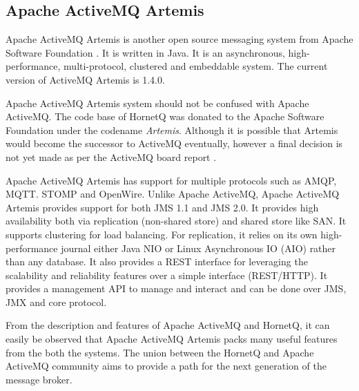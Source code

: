 \subsection{Apache ActiveMQ Artemis}

Apache ActiveMQ Artemis is another open source messaging system from Apache Software Foundation \parencite{artemis_home}. It is written in Java. It is an asynchronous, high-performance, multi-protocol, clustered and embeddable system. The current version of ActiveMQ Artemis is 1.4.0.

Apache ActiveMQ Artemis system should not be confused with Apache ActiveMQ. The code base of HornetQ was donated to the Apache Software Foundation under the codename \textit{Artemis}. Although it is possible that Artemis would become the successor to ActiveMQ eventually, however a final decision is not yet made as per the ActiveMQ board report \parencite{artemis_vs_activemq}.

Apache ActiveMQ Artemis has support for multiple protocols such as AMQP, MQTT. STOMP and OpenWire. Unlike Apache ActiveMQ, Apache ActiveMQ Artemis provides support for both JMS 1.1 and JMS 2.0. It provides high availability both via replication (non-shared store) and shared store like SAN. It supports clustering for load balancing. For replication, it relies on its own high-performance journal either Java NIO or Linux Asynchronous IO (AIO) rather than any database. It also provides a REST interface for leveraging the scalability and reliability features over a simple interface (REST/HTTP). It provides a management API to manage and interact and can be done over JMS, JMX and core protocol.

From the description and features of Apache ActiveMQ and HornetQ, it can easily be observed that Apache ActiveMQ Artemis packs many useful features from the both the systems. The union between the HornetQ and Apache ActiveMQ community aims to provide a path for the next generation of the message broker. 
